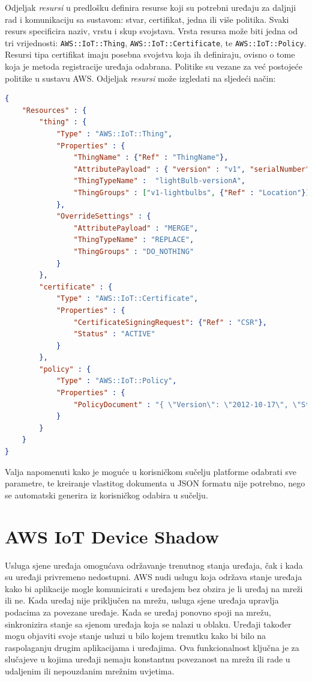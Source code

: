 Odjeljak \textit{resursi} u predlošku definira resurse koji su potrebni uređaju za daljnji rad i komunikaciju sa sustavom: stvar, certifikat, jedna ili više politika. Svaki resurs specificira naziv, vrstu i skup svojstava. Vrsta resursa može biti jedna od tri vrijednosti: \lstinline|AWS::IoT::Thing|, \lstinline|AWS::IoT::Certificate|, te \lstinline|AWS::IoT::Policy|. Resursi tipa certifikat imaju posebna svojstva koja ih definiraju, ovisno o tome koja je metoda registracije uređaja odabrana. Politike su vezane za već postojeće politike u sustavu AWS. Odjeljak \textit{resursi} može izgledati na sljedeći način:

\begin{lstlisting}[caption={Odjeljak \textit{resursi} u predlošku za registraciju}, language=json]
{ 
	"Resources" : {
		"thing" : {
			"Type" : "AWS::IoT::Thing",
			"Properties" : {
				"ThingName" : {"Ref" : "ThingName"},
				"AttributePayload" : { "version" : "v1", "serialNumber" :  {"Ref" : "SerialNumber"}}, 
				"ThingTypeName" :  "lightBulb-versionA",
				"ThingGroups" : ["v1-lightbulbs", {"Ref" : "Location"}]
			},
			"OverrideSettings" : {
				"AttributePayload" : "MERGE",
				"ThingTypeName" : "REPLACE",
				"ThingGroups" : "DO_NOTHING"
			}
		},  
		"certificate" : {
			"Type" : "AWS::IoT::Certificate",
			"Properties" : {
				"CertificateSigningRequest": {"Ref" : "CSR"},
				"Status" : "ACTIVE"      
			}
		},
		"policy" : {
			"Type" : "AWS::IoT::Policy",
			"Properties" : {
				"PolicyDocument" : "{ \"Version\": \"2012-10-17\", \"Statement\": [{ \"Effect\": \"Allow\", \"Action\":[\"iot:Publish\"], \"Resource\": [\"arn:aws:iot:us-east-1:123456789012:topic/foo/bar\"] }] }"
			}
		}
	}
}
\end{lstlisting}

Valja napomenuti kako je moguće u korisničkom sučelju platforme odabrati sve parametre, te kreiranje vlastitog dokumenta u JSON formatu nije potrebno, nego se automatski generira iz korisničkog odabira u sučelju. 

\section{AWS IoT Device Shadow}

Usluga sjene uređaja  omogućava održavanje trenutnog stanja uređaja, čak i kada su uređaji privremeno nedostupni. AWS nudi uslugu koja održava stanje uređaja kako bi aplikacije mogle komunicirati s uređajem bez obzira je li uređaj na mreži ili ne. Kada uređaj nije priključen na mrežu, usluga sjene uređaja upravlja podacima za povezane uređaje. Kada se uređaj ponovno spoji na mrežu, sinkronizira stanje sa sjenom uređaja koja se nalazi u oblaku. Uređaji također mogu objaviti svoje stanje usluzi u bilo kojem trenutku kako bi bilo na raspolaganju drugim aplikacijama i uređajima. Ova funkcionalnost ključna je za slučajeve u kojima uređaji nemaju konstantnu povezanost na mrežu ili rade u udaljenim ili nepouzdanim mrežnim uvjetima.

